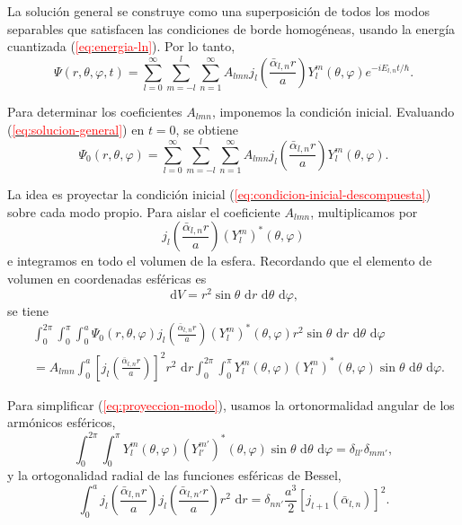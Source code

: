 \documentclass[11pt]{article}
\renewcommand{\eqref}[1]{(\hyperref[#1]{\textcolor{red}{\ref*{#1}}})}
\newcommand{\dd}{\,\mathrm{d}}
\begin{document}
La solución general se construye como una superposición de todos los modos separables que satisfacen las condiciones de borde homogéneas, usando la energía cuantizada \eqref{eq:energia-ln}. Por lo tanto,
\begin{equation}\label{eq:solucion-general}
\Psi(r,\theta,\varphi,t) = \sum_{l=0}^{\infty} \sum_{m=-l}^{l} \sum_{n=1}^{\infty} A_{lmn} j_l\left(\frac{\bar\alpha_{l,n} r}{a}\right) Y_l^m(\theta, \varphi) e^{-i E_{l,n} t / \hbar}.
\end{equation}

Para determinar los coeficientes $A_{lmn}$, imponemos la condición inicial. Evaluando \eqref{eq:solucion-general} en $t=0$, se obtiene
\begin{equation}\label{eq:condicion-inicial-descompuesta}
\Psi_0(r,\theta,\varphi)
=
\sum_{l=0}^{\infty} \sum_{m=-l}^{l} \sum_{n=1}^{\infty}
A_{lmn}
 j_l\left(\frac{\bar\alpha_{l,n} r}{a}\right)Y_l^m(\theta,\varphi).
\end{equation}

La idea es proyectar la condición inicial \eqref{eq:condicion-inicial-descompuesta} sobre cada modo propio. Para aislar el coeficiente $A_{lmn}$, multiplicamos por
\[
 j_l\left(\frac{\bar\alpha_{l,n}r}{a}\right)(Y_l^m)^*(\theta,\varphi)
\]
e integramos en todo el volumen de la esfera. Recordando que el elemento de volumen en coordenadas esféricas es
\[
\dd V = r^2\sin\theta\,\dd r\,\dd\theta\,\dd\varphi,
\]
se tiene
\begin{align}\label{eq:proyeccion-modo}
&\int_0^{2\pi}\int_0^\pi\int_0^a
\Psi_0(r,\theta,\varphi)
 j_l\left(\frac{\bar\alpha_{l,n}r}{a}\right)
 (Y_l^m)^*(\theta,\varphi)
 r^2\sin\theta\,\dd r\,\dd\theta\,\dd\varphi
\nonumber \\
&= A_{lmn}
\int_0^a
\left[j_l\left(\frac{\bar\alpha_{l,n}r}{a}\right)\right]^2 r^2\,\dd r
\int_0^{2\pi}\int_0^\pi
Y_l^m(\theta,\varphi)(Y_l^m)^*(\theta,\varphi)
\sin\theta\,\dd\theta\,\dd\varphi .
\end{align}

Para simplificar \eqref{eq:proyeccion-modo}, usamos la ortonormalidad angular de los armónicos esféricos,
\begin{equation}\label{eq:ortogonalidad-angular}
\int_0^{2\pi}\int_0^\pi
Y_l^m(\theta,\varphi)(Y_{l'}^{m'})^*(\theta,\varphi)
\sin\theta\,\dd\theta\,\dd\varphi
=\delta_{ll'}\delta_{mm'},
\end{equation}
y la ortogonalidad radial de las funciones esféricas de Bessel,
\begin{equation}\label{eq:ortogonalidad-radial}
\int_0^a
j_l\left(\frac{\bar\alpha_{l,n}r}{a}\right)
 j_l\left(\frac{\bar\alpha_{l,n'}r}{a}\right)r^2\,\dd r
=\delta_{nn'}\frac{a^3}{2}\left[j_{l+1}(\bar\alpha_{l,n})\right]^2.
\end{equation}
\end{document}

